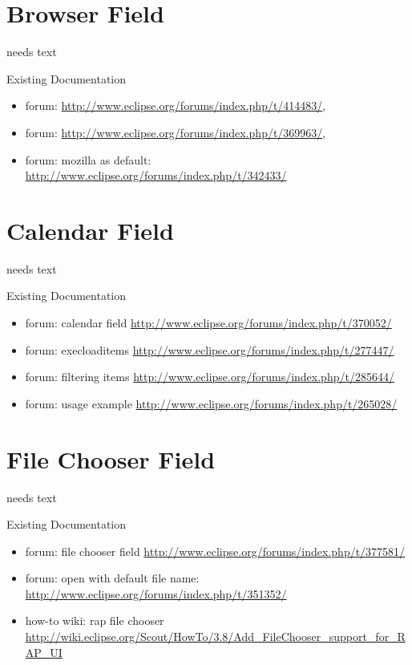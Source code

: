 \documentclass[a4paper,10pt,twoside]{book}
\begin{document}
\section{Browser Field}
needs text

\noindent Existing Documentation
\begin{itemize}
  \item forum: \url{http://www.eclipse.org/forums/index.php/t/414483/}, 
  \item forum: \url{http://www.eclipse.org/forums/index.php/t/369963/}, 
  \item forum: mozilla as default: \url{http://www.eclipse.org/forums/index.php/t/342433/}
\end{itemize}

\section{Calendar Field}
needs text

\noindent Existing Documentation
\begin{itemize}
  \item forum: calendar field \url{http://www.eclipse.org/forums/index.php/t/370052/}
  \item forum: execloaditems \url{http://www.eclipse.org/forums/index.php/t/277447/}
  \item forum: filtering items \url{http://www.eclipse.org/forums/index.php/t/285644/}
  \item forum: usage example \url{http://www.eclipse.org/forums/index.php/t/265028/}
\end{itemize}

\section{File Chooser Field}
needs text

\noindent Existing Documentation
\begin{itemize}
  \item forum: file chooser field \url{http://www.eclipse.org/forums/index.php/t/377581/}
  \item forum: open with default file name: \url{http://www.eclipse.org/forums/index.php/t/351352/}
  \item how-to wiki: rap file chooser \url {http://wiki.eclipse.org/Scout/HowTo/3.8/Add_FileChooser_support_for_RAP_UI}
\end{itemize}
\end{document}
